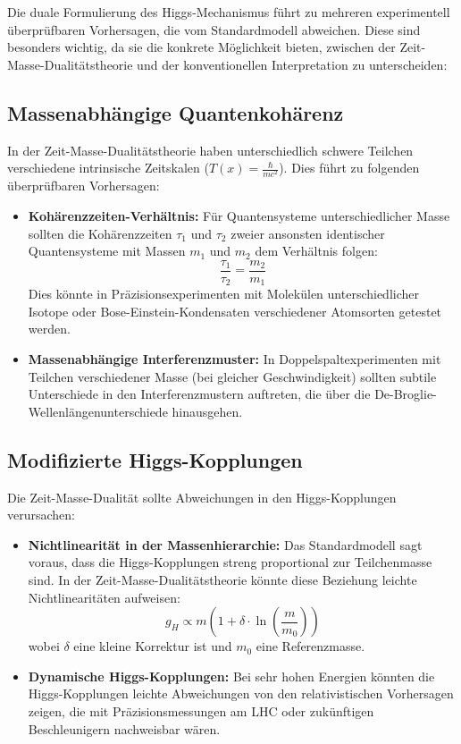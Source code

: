 \documentclass[a4paper,12pt]{article}
\newcommand{\Tfield}{T(x)} %
\begin{document}
	Die duale Formulierung des Higgs-Mechanismus führt zu mehreren experimentell überprüfbaren Vorhersagen, die vom Standardmodell abweichen. Diese sind besonders wichtig, da sie die konkrete Möglichkeit bieten, zwischen der Zeit-Masse-Dualitätstheorie und der konventionellen Interpretation zu unterscheiden:
	
	\subsection{Massenabhängige Quantenkohärenz}
	
	In der Zeit-Masse-Dualitätstheorie haben unterschiedlich schwere Teilchen verschiedene intrinsische Zeitskalen ($\Tfield = \frac{\hbar}{mc^2}$). Dies führt zu folgenden überprüfbaren Vorhersagen:
	
	\begin{itemize}
		\item \textbf{Kohärenzzeiten-Verhältnis:} Für Quantensysteme unterschiedlicher Masse sollten die Kohärenzzeiten $\tau_1$ und $\tau_2$ zweier ansonsten identischer Quantensysteme mit Massen $m_1$ und $m_2$ dem Verhältnis folgen:
		\begin{equation}
			\frac{\tau_1}{\tau_2} = \frac{m_2}{m_1}
		\end{equation}
		Dies könnte in Präzisionsexperimenten mit Molekülen unterschiedlicher Isotope oder Bose-Einstein-Kondensaten verschiedener Atomsorten getestet werden.
		
		\item \textbf{Massenabhängige Interferenzmuster:} In Doppelspaltexperimenten mit Teilchen verschiedener Masse (bei gleicher Geschwindigkeit) sollten subtile Unterschiede in den Interferenzmustern auftreten, die über die De-Broglie-Wellenlängenunterschiede hinausgehen.
	\end{itemize}
	
	\subsection{Modifizierte Higgs-Kopplungen}
	
	Die Zeit-Masse-Dualität sollte Abweichungen in den Higgs-Kopplungen verursachen:
	
	\begin{itemize}
		\item \textbf{Nichtlinearität in der Massenhierarchie:} Das Standardmodell sagt voraus, dass die Higgs-Kopplungen streng proportional zur Teilchenmasse sind. In der Zeit-Masse-Dualitätstheorie könnte diese Beziehung leichte Nichtlinearitäten aufweisen:
		\begin{equation}
			g_H \propto m \left(1 + \delta \cdot \ln\left(\frac{m}{m_0}\right)\right)
		\end{equation}
		wobei $\delta$ eine kleine Korrektur ist und $m_0$ eine Referenzmasse.
		
		\item \textbf{Dynamische Higgs-Kopplungen:} Bei sehr hohen Energien könnten die Higgs-Kopplungen leichte Abweichungen von den relativistischen Vorhersagen zeigen, die mit Präzisionsmessungen am LHC oder zukünftigen Beschleunigern nachweisbar wären.
	\end{itemize}
	
\end{document}
